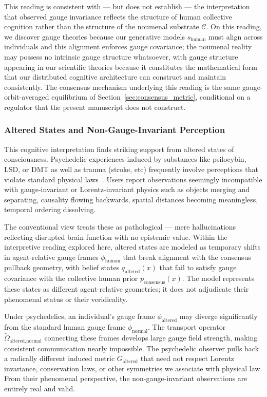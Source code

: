 \documentclass[11pt]{article}
\begin{document}
This reading is consistent with --- but does not establish --- the interpretation that observed gauge invariance reflects the structure of human collective cognition rather than the structure of the noumenal substrate $\mathcal{C}$. On this reading, we discover gauge theories because our generative models $s_{\text{human}}$ must align across individuals and this alignment enforces gauge covariance; the noumenal reality may possess no intrinsic gauge structure whatsoever, with gauge structure appearing in our scientific theories because it constitutes the mathematical form that our distributed cognitive architecture can construct and maintain consistently. The consensus mechanism underlying this reading is the same gauge-orbit-averaged equilibrium of Section~\ref{sec:consensus_metric}, conditional on a regulator that the present manuscript does not construct.

\subsubsection{Altered States and Non-Gauge-Invariant Perception}

This cognitive interpretation finds striking support from altered states of consciousness. Psychedelic experiences induced by substances like psilocybin, LSD, or DMT as well as trauma (stroke, etc) frequently involve perceptions that violate standard physical laws~\cite{Carhart-Harris2014, Swanson2018, CarhartHarrisFriston2019}. Users report observations seemingly incompatible with gauge-invariant or Lorentz-invariant physics such as objects merging and separating, causality flowing backwards, spatial distances becoming meaningless, temporal ordering dissolving.

The conventional view treats these as pathological — mere hallucinations reflecting disrupted brain function with no epistemic value. Within the interpretive reading explored here, altered states are modeled as temporary shifts in agent-relative gauge frames $\phi_{\text{human}}$ that break alignment with the consensus pullback geometry, with belief states $q_{\text{altered}}(x)$ that fail to satisfy gauge covariance with the collective human prior $p_{\text{consensus}}(x)$. The model represents these states as different agent-relative geometries; it does not adjudicate their phenomenal status or their veridicality.

Under psychedelics, an individual's gauge frame $\phi_{\text{altered}}$ may diverge significantly from the standard human gauge frame $\phi_{\text{normal}}$. The transport operator $\tilde{\Omega}_{\text{altered,normal}}$ connecting these frames develops large gauge field strength, making consistent communication nearly impossible. The psychedelic observer pulls back a radically different induced metric $G_{\text{altered}}$ that need not respect Lorentz invariance, conservation laws, or other symmetries we associate with physical law. From their phenomenal perspective, the non-gauge-invariant observations are entirely real and valid.
\end{document}
